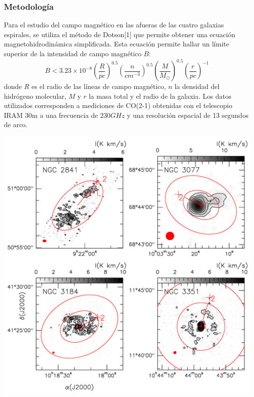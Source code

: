 \documentclass[8pt]{beamer}
\begin{document}
\begin{frame}
\frametitle{Metodología}
Para el estudio del campo magnético en las afueras de las cuatro galaxias espirales, se utiliza el método de Dotson[1] que permite obtener una ecuación magnetohidrodinámica simplificada. Esta ecuación permite hallar un límite superior de la intensidad de campo magnético $B$:
\begin{equation*}
    B<3.23\times 10^{-8}\left(\frac{R}{pc}\right)^{0.5}\left(\frac{n}{cm^{-3}}\right)^{0.5}\left(\frac{M}{M_{\odot }}\right)^{0.5}\left(\frac{r}{pc}\right)^{-1}
\end{equation*}
donde $R$ es el radio de las líneas de campo magnético, $n$ la densidad del hidrógeno molecular, $M$ y $r$ la masa total y el radio de la galaxia. Los datos utilizados corresponden a mediciones de CO(2-1) obtenidas con el telescopio IRAM 30m a una frecuencia de $230GHz$ y una resolución espacial de 13 segundos de arco.
\begin{center}
\includegraphics[width=0.8\linewidth]{figures/galaxies.jpg}
\end{center}
\end{frame}
\end{document}
